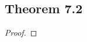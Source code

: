 \documentclass[../../main.tex]{subfiles}
\begin{document}
\subsection{Theorem 7.2}
\begin{wts}

\end{wts}
\begin{proof}

\end{proof}
\end{document}
